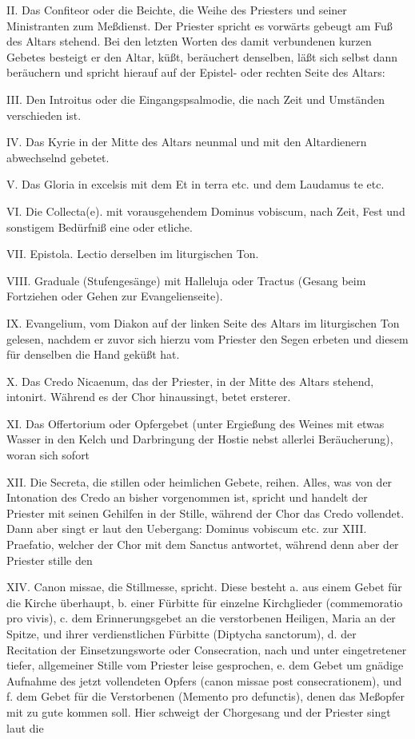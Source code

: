 II. Das Confiteor oder die Beichte, die Weihe des Priesters und seiner Ministranten zum Meßdienst. Der Priester spricht es vorwärts gebeugt am Fuß des Altars stehend. Bei den letzten Worten des damit verbundenen kurzen Gebetes besteigt er den Altar, küßt, beräuchert denselben, läßt sich selbst dann beräuchern und spricht hierauf auf der Epistel- oder rechten Seite des Altars:

III. Den Introitus oder die Eingangspsalmodie, die nach Zeit und Umständen verschieden ist.

IV. Das Kyrie in der Mitte des Altars neunmal und mit den Altardienern abwechselnd gebetet.

V. Das Gloria in excelsis mit dem Et in terra etc. und dem Laudamus te etc.

VI. Die Collecta(e). mit vorausgehendem Dominus vobiscum, nach Zeit, Fest und sonstigem Bedürfniß eine oder etliche.

VII. Epistola. Lectio derselben im liturgischen Ton.

VIII. Graduale (Stufengesänge) mit Halleluja oder Tractus (Gesang beim Fortziehen oder Gehen zur Evangelienseite).

IX. Evangelium, vom Diakon auf der linken Seite des Altars im liturgischen Ton gelesen, nachdem er zuvor sich hierzu vom Priester den Segen erbeten und diesem für denselben die Hand geküßt hat.

X. Das Credo Nicaenum, das der Priester, in der Mitte des Altars stehend, intonirt. Während es der Chor hinaussingt, betet ersterer.

XI. Das Offertorium oder Opfergebet (unter Ergießung des Weines mit etwas Wasser in den Kelch und Darbringung der Hostie nebst allerlei Beräucherung), woran sich sofort

XII. Die Secreta, die stillen oder heimlichen Gebete, reihen. Alles, was von der Intonation des Credo an bisher vorgenommen ist, spricht und handelt der Priester mit seinen Gehilfen in der Stille, während der Chor das Credo vollendet. Dann aber singt er laut den Uebergang: Dominus vobiscum etc. zur
XIII. Praefatio, welcher der Chor mit dem Sanctus antwortet, während denn aber der Priester stille den

XIV. Canon missae, die Stillmesse, spricht. Diese besteht a. aus einem Gebet für die Kirche überhaupt, b. einer Fürbitte für einzelne Kirchglieder (commemoratio pro vivis), c. dem Erinnerungsgebet an die verstorbenen Heiligen, Maria an der Spitze, und ihrer verdienstlichen Fürbitte (Diptycha sanctorum), d. der Recitation der Einsetzungsworte oder Consecration, nach und unter eingetretener tiefer, allgemeiner Stille vom Priester leise gesprochen, e. dem Gebet um gnädige Aufnahme des jetzt vollendeten Opfers (canon missae post consecrationem), und f. dem Gebet für die Verstorbenen (Memento pro defunctis), denen das Meßopfer mit zu gute kommen soll. Hier schweigt der Chorgesang und der Priester singt laut die

